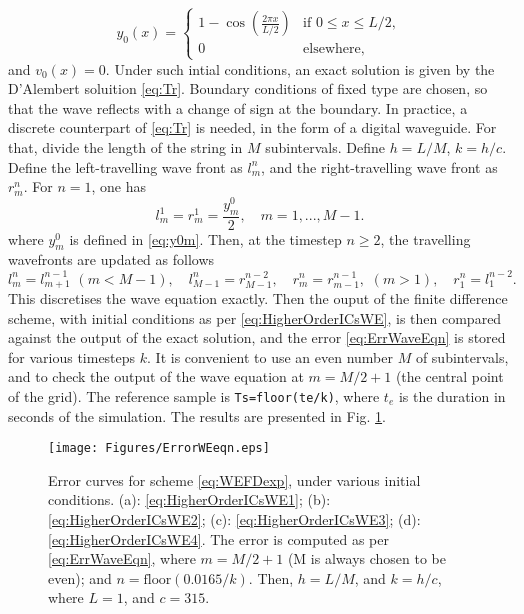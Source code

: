 \begin{equation}
y_0(x)  = 
\left\{ 
\begin{array}{ll}
1 - \cos \left(\frac{2\pi x}{L/2}\right)& \text{if }0\leq x \leq L/2, \\
0 & \text{elsewhere,}
\end{array}
\right.
\end{equation}
and $v_0(x)=0$. Under such intial conditions, an exact solution is given by the D'Alembert soluition \eqref{eq:Tr}. Boundary conditions of fixed type are chosen, so that the wave reflects with a change of sign at the boundary. In practice, a discrete counterpart of \eqref{eq:Tr} is needed, in the form of a digital waveguide. For that, divide the length of the string in $M$ subintervals. Define $h=L/M$, $k = h/c$. 
Define the left-travelling wave front as $l_{m}^n$, and the right-travelling wave front as $r^n_m$. For $n=1$, one has
\begin{equation}
l^1_m = r^1_m = \frac{y^0_m}{2},\quad m=1,...,M-1.
\end{equation}
 where $y^0_m$ is defined in \eqref{eq:y0m}. Then, at the timestep $n\geq 2$, the travelling wavefronts are updated as follows
\begin{equation}
l^n_m = l^{n-1}_{m+1}  \,\, (m < M-1), \quad
l^n_{M-1} = r^{n-2}_{M-1}, \quad
r^n_m = r^{n-1}_{m-1}, \,\, (m > 1), \quad
r^n_1 = l^{n-2}_{1}.
\end{equation}
This discretises the wave equation exactly. Then the ouput of the finite difference scheme, with initial conditions as per \eqref{eq:HigherOrderICsWE}, is then compared against the output of the exact solution, and the error \eqref{eq:ErrWaveEqn} is stored for various timesteps $k$. It is convenient to use an even number $M$ of subintervals, and to check the output of the wave equation at $m=M/2 +1$ (the central point of the grid). The reference sample is \texttt{Ts=floor(te/k)}, where $t_e$ is the duration in seconds of the simulation. The results are presented in Fig. \ref{fig:ErrorCurvesWE}. 
\begin{figure}[hbt]
\centering
\texttt{[image: Figures/ErrorWEeqn.eps]}
\caption{Error curves for scheme \eqref{eq:WEFDexp}, under various initial conditions. (a): \eqref{eq:HigherOrderICsWE1}; (b): \eqref{eq:HigherOrderICsWE2}; (c): \eqref{eq:HigherOrderICsWE3}; (d): \eqref{eq:HigherOrderICsWE4}. The error is computed as per \eqref{eq:ErrWaveEqn}, where $m = M/2 + 1$ (M is always chosen to be even); and $n = \text{floor}(0.0165/k)$. Then, $h=L/M$, and $k = h/c$, where $L=1$, and $c=315$.}\label{fig:ErrorCurvesWE}
\end{figure}
